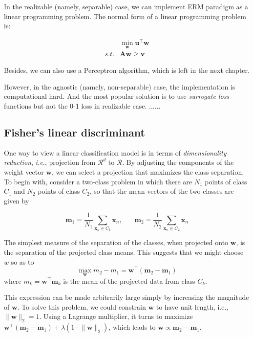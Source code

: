 \documentclass{article}
\begin{document}
	In the realizable (namely, separable) case, we can implement ERM paradigm as a linear programming problem. The normal form of a linear programming problem is:
	
	\begin{equation*}
	\begin{split}
	&\min_\mathbf{w} \mathbf{u}^\top \mathbf{w} \\
	s.t. & \mathbf{Aw} \geq \mathbf{v}
	\end{split}
	\end{equation*}
	
Besides, we can also use a Perceptron algorithm, which is left in the next chapter.
	
	However, in the agnostic (namely, non-separable) case, the implementation is computational hard. And the most popular solution is to use \textit{surrogate loss} functions but not the 0-1 loss in realizable case. ......
	
	\subsection{Fisher's linear discriminant}
	
	One way to view a linear classification model is in terms of \textit{dimensionality reduction}, \textit{i.e.}, projection from $\mathcal{R}^d$ to $\mathcal{R}$. By adjusting the components of the weight vector $\mathbf{w}$, we can select a projection that maximizes the class separation. To begin with, consider a two-class problem in which there are $N_1$ points of class $C_1$ and $N_2$ points of class $C_2$, so that the mean vectors of the two classes are given by

	\begin{equation*}
	\mathbf{m}_1 = \frac{1}{N_1} \sum_{\mathbf{x}_n \in C_1} \mathbf{x}_n,\ \ \ \ \ \ \ \ 
	\mathbf{m}_2 = \frac{1}{N_2} \sum_{\mathbf{x}_n \in C_2} \mathbf{x}_n
	\end{equation*}
	
	The simplest measure of the separation of the classes, when projected onto $\mathbf{w}$, is the separation of the projected class means. This suggests that we might choose $w$ so as to
	\begin{equation*}
	\max_\mathbf{w} m_2- m_1=\mathbf{w}^\top (\mathbf{m}_2-\mathbf{m}_1)
	\end{equation*}
where $m_k=\mathbf{w}^\top \mathbf{m}_k$ is the mean of the projected data from class $C_k$. 

	This expression can be made arbitrarily large simply by increasing the magnitude of $\mathbf{w}$. To solve this problem, we could constrain $\mathbf{w}$ to have unit length, i.e., $\|\mathbf{w}\|_2=1$. Using a Lagrange multiplier, it turns to maximize $\mathbf{w}^\top (\mathbf{m}_2-\mathbf{m}_1) + \lambda (1-\|\mathbf{w}\|_2)$, which leads to $\mathbf{w}\propto \mathbf{m}_2-\mathbf{m}_1$.
	
\end{document}
